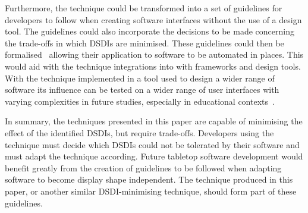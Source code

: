 \documentclass{bmcart}
\begin{document}
Furthermore, the technique could be transformed into a set of guidelines for developers to follow when creating software interfaces without the use of a design tool.
The guidelines could also incorporate the decisions to be made concerning the trade-offs in which \acp{DSDI} are minimised.
These guidelines could then be formalised~\cite{Ngo2000} allowing their application to software to be automated in places.
This would aid with the technique integrations into with frameworks and design tools.
With the technique implemented in a tool used to design a wider range of software its influence can be tested on a wider range of user interfaces with varying complexities in future studies, especially in educational contexts~\cite{McNaughton2017,jg-et-al:2017}.

In summary, the techniques presented in this paper are capable of minimising the effect of the identified \acp{DSDI}, but require trade-offs.
Developers using the technique must decide which \acp{DSDI} could not be tolerated by their software and must adapt the technique according.
Future tabletop software development would benefit greatly from the creation of guidelines to be followed when adapting software to become display shape independent.
The technique produced in this paper, or another similar \ac{DSDI}-minimising technique, should form part of these guidelines.


\end{document}
